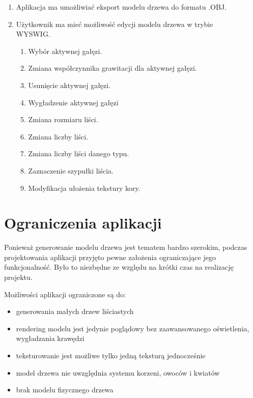 \begin{enumerate}
\item Aplikacja ma umożliwiać eksport modelu drzewa do formatu .OBJ.
\item Użytkownik ma mieć możliwość edycji modelu drzewa w trybie \\WYSWIG.
\begin{enumerate}
\item Wybór aktywnej gałęzi.
\item Zmiana współczynnika grawitacji dla aktywnej gałęzi.
\item Usunięcie aktywnej gałęzi.
\item Wygładzenie aktywnej gałęzi
\item Zmiana rozmiaru liści.
\item Zmiana liczby liści.
\item Zmiana liczby liści danego typu.
\item Zaznaczenie szypułki liścia.
\item Modyfikacja ułożenia tekstury kory.
\end{enumerate}
\end{enumerate}

\section{Ograniczenia aplikacji}
Ponieważ generowanie modelu drzewa jest tematem bardzo szerokim, podczas projektowania
aplikacji przyjęto pewne założenia ograniczające jego funkcjonalność. Było to niezbędne ze
względu na krótki czas na realizację projektu.

Możliwości aplikacji ograniczone są do:
\begin{itemize}
	\item {generowania małych drzew liściastych}
	\item {rendering modelu jest jedynie poglądowy bez zaawansowanego oświetlenia, wygładzania krawędzi}
	\item {teksturowanie jest możliwe tylko jedną teksturą jednocześnie}
	\item {model drzewa nie uwzględnia systemu korzeni, owoców i kwiatów}
	\item {brak modelu fizycznego drzewa}
\end{itemize}
